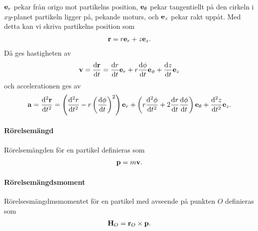 $\vect{e}_{r}$ pekar från origo mot partikelns position, $\vect{e}_{\theta}$ pekar tangentiellt på den cirkeln i $xy$-planet partikeln ligger på, pekande moturs, och $\vect{e}_{z}$ pekar rakt uppåt. Med detta kan vi skriva partikelns position som
\begin{align*}
	\vect{r} = r\vect{e}_{r} + z\vect{e}_{z}.
\end{align*}
Då ges hastigheten av
\begin{align*}
	\vect{v} = \dv{\vect{r}}{t} = \dv{r}{t}\vect{e}_{r} + r\dv{\phi}{t}\vect{e}_{\phi} + \dv{z}{t}\vect{e}_{z}
\end{align*}
och accelerationen ges av
\begin{align*}
	\vect{a} = \dv[2]{\vect{r}}{t} = \left(\dv[2]{r}{t} - r\left(\dv{\phi}{t}\right)^2\right)\vect{e}_{r} + \left(r\dv[2]{\phi}{t} + 2\dv{r}{t}\dv{\phi}{t}\right)\vect{e}_{\theta} + \dv[2]{z}{t}\vect{e}_{z}.
\end{align*}

\paragraph{Rörelsemängd}
Rörelsemängden för en partikel definieras som
\begin{align*}
	\vect{p} = m\vect{v}.
\end{align*}

\paragraph{Rörelsemängdsmoment}
Rörelsesmängdmsmomentet för en partikel med avseende på punkten $O$ definieras som
\begin{align*}
	\vb{H}_{O} = \vb{r}_{O}\times\vb{p}.
\end{align*}